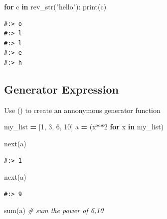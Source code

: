 \documentclass[
]{book}
\newenvironment{Shaded}{\begin{snugshade}}{\end{snugshade}}
\newcommand{\BuiltInTok}[1]{#1}
\newcommand{\CommentTok}[1]{\textcolor[rgb]{0.37,0.37,0.37}{\textit{#1}}}
\newcommand{\ControlFlowTok}[1]{\textcolor[rgb]{0.27,0.27,0.27}{\textbf{#1}}}
\newcommand{\DecValTok}[1]{\textcolor[rgb]{0.06,0.06,0.06}{#1}}
\newcommand{\KeywordTok}[1]{\textcolor[rgb]{0.27,0.27,0.27}{\textbf{#1}}}
\newcommand{\NormalTok}[1]{#1}
\newcommand{\OperatorTok}[1]{\textcolor[rgb]{0.43,0.43,0.43}{\textbf{#1}}}
\newcommand{\StringTok}[1]{\textcolor[rgb]{0.5,0.5,0.5}{#1}}
\begin{document}
\begin{Shaded}
\begin{Highlighting}[]
\ControlFlowTok{for}\NormalTok{ c }\KeywordTok{in}\NormalTok{ rev_str(}\StringTok{"hello"}\NormalTok{):}
     \BuiltInTok{print}\NormalTok{(c)}
\end{Highlighting}
\end{Shaded}

\begin{verbatim}
#:> o
#:> l
#:> l
#:> e
#:> h
\end{verbatim}

\hypertarget{generator-expression}{%
\subsection{Generator Expression}\label{generator-expression}}

Use () to create an annonymous generator function

\begin{Shaded}
\begin{Highlighting}[]
\NormalTok{my_list }\OperatorTok{=}\NormalTok{ [}\DecValTok{1}\NormalTok{, }\DecValTok{3}\NormalTok{, }\DecValTok{6}\NormalTok{, }\DecValTok{10}\NormalTok{]}
\NormalTok{a }\OperatorTok{=}\NormalTok{ (x}\OperatorTok{**}\DecValTok{2} \ControlFlowTok{for}\NormalTok{ x }\KeywordTok{in}\NormalTok{ my_list)}
\end{Highlighting}
\end{Shaded}

\begin{Shaded}
\begin{Highlighting}[]
\BuiltInTok{next}\NormalTok{(a)}
\end{Highlighting}
\end{Shaded}

\begin{verbatim}
#:> 1
\end{verbatim}

\begin{Shaded}
\begin{Highlighting}[]
\BuiltInTok{next}\NormalTok{(a)}
\end{Highlighting}
\end{Shaded}

\begin{verbatim}
#:> 9
\end{verbatim}

\begin{Shaded}
\begin{Highlighting}[]
\BuiltInTok{sum}\NormalTok{(a) }\CommentTok{# sum the power of 6,10}
\end{Highlighting}
\end{Shaded}
\end{document}
